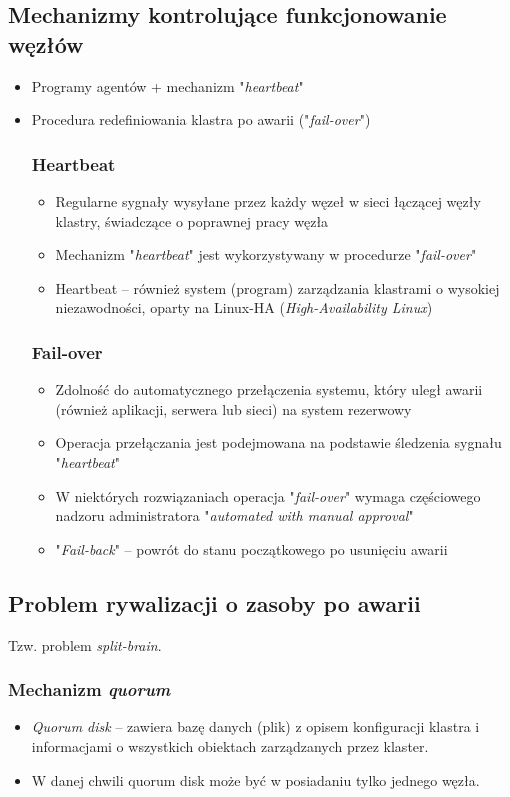 \documentclass[a4paper,twoside]{article}
\begin{document}
\subsection{Mechanizmy kontrolujące funkcjonowanie węzłów}
\begin{itemize}
	\item Programy agentów + mechanizm "\emph{heartbeat}"
	\item Procedura redefiniowania klastra po awarii ("\emph{fail-over}")
	\subsubsection{Heartbeat}
	\begin{itemize}
		\item Regularne sygnały wysyłane przez każdy węzeł w sieci łączącej węzły klastry, świadczące o poprawnej pracy węzła
		\item Mechanizm "\emph{heartbeat}" jest wykorzystywany w procedurze "\emph{fail-over}"
		\item Heartbeat – również system (program) zarządzania klastrami o wysokiej niezawodności, oparty na Linux-HA (\textit{High-Availability Linux})
	\end{itemize}
	\subsubsection{Fail-over}
	\begin{itemize}
		\item Zdolność do automatycznego przełączenia systemu, który uległ awarii (również aplikacji, serwera lub sieci) na system rezerwowy
		\item Operacja przełączania jest podejmowana na podstawie śledzenia sygnału "\emph{heartbeat}"
		\item W niektórych rozwiązaniach operacja "\emph{fail-over}" wymaga częściowego nadzoru administratora "\textit{automated with manual approval}"
		\item "\emph{Fail-back}" – powrót do stanu początkowego po usunięciu awarii
	\end{itemize}
\end{itemize}
\subsection{Problem rywalizacji o zasoby po awarii}
Tzw. problem \textit{split-brain}.
\subsubsection{Mechanizm \textit{quorum}}
\begin{itemize}
	\item \emph{Quorum disk} – zawiera bazę danych (plik) z opisem konfiguracji klastra i informacjami o wszystkich obiektach zarządzanych przez klaster.
	\item W danej chwili quorum disk może być w posiadaniu tylko jednego węzła.
\end{itemize}
\end{document}
